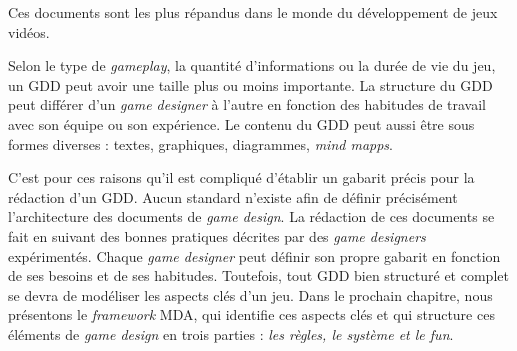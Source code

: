 %  
Ces documents sont les plus répandus dans le monde du développement de jeux vidéos. 

Selon le type de \emph{gameplay}, la quantité d'informations ou la durée de vie du jeu, un GDD peut avoir une taille plus ou moins importante. 
%
La structure du GDD peut différer d'un \emph{game designer} à l'autre en fonction des habitudes de travail avec son équipe ou son expérience.
Le contenu du GDD peut aussi être sous formes diverses :  textes,  graphiques, diagrammes,  \emph{mind mapps}. 



C'est pour ces raisons qu'il est compliqué d'établir un gabarit précis pour la rédaction d'un GDD.
Aucun standard n'existe afin de définir précisément l'architecture des documents de \emph{game design}.
La rédaction de ces documents se fait en suivant des bonnes pratiques décrites par des \emph{game designers} expérimentés.
Chaque \emph{game designer} peut définir son propre gabarit en fonction de ses besoins et de ses habitudes.
%
%
Toutefois, tout GDD bien structuré et complet se devra de modéliser les aspects clés d'un jeu. 
Dans le prochain chapitre, nous présentons le \emph{framework} MDA, qui identifie ces aspects clés et qui structure ces éléments de \emph{game design} en trois parties : \emph{les règles, le système et le fun}.
